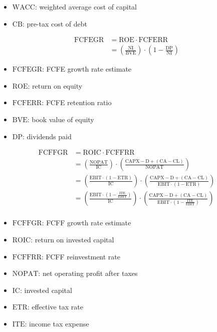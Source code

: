 \begin{itemize}
  \item[] $\text{WACC}$: weighted average cost of capital
  \item[] $\text{CB}$: pre-tax cost of debt
\end{itemize}

$$
\begin{aligned}
\text{FCFEGR} &= \text{ROE} \cdot \text{FCFERR} \\
&= \left( \frac{\text{NI}}{\text{BVE}} \right) \cdot \left( 1 - \frac{\text{DP}}{\text{NI}} \right)
\end{aligned}
$$

\begin{itemize}
  \item[] $\text{FCFEGR}$: FCFE growth rate estimate
  \item[] $\text{ROE}$: return on equity
  \item[] $\text{FCFERR}$: FCFE retention ratio
  \item[] $\text{BVE}$: book value of equity 
  \item[] $\text{DP}$: dividends paid
\end{itemize}

$$
\begin{aligned}
\text{FCFFGR} &= \text{ROIC} \cdot \text{FCFFRR} \\
&= \left( \frac{\text{NOPAT}}{\text{IC}} \right) \cdot \left( \frac{\text{CAPX} - \text{D} + (\text{CA} - \text{CL})}{\text{NOPAT}} \right) \\
&= \left( \frac{\text{EBIT} \cdot (1 - \text{ETR})}{\text{IC}} \right) \cdot \left( \frac{\text{CAPX} - \text{D} + (\text{CA} - \text{CL})}{\text{EBIT} \cdot (1 - \text{ETR})} \right) \\
&= \left( \frac{\text{EBIT} \cdot \left(1 - \frac{\text{ITE}}{\text{EBIT}} \right)}{\text{IC}} \right) \cdot \left( \frac{\text{CAPX} - \text{D} + (\text{CA} - \text{CL})}{\text{EBIT} \cdot \left(1 - \frac{\text{ITE}}{\text{EBIT}} \right) } \right) \\
\end{aligned}
$$

\begin{itemize}
  \item[] $\text{FCFFGR}$: FCFF growth rate estimate
  \item[] $\text{ROIC}$: return on invested capital
  \item[] $\text{FCFFRR}$: FCFF reinvestment rate
  \item[] $\text{NOPAT}$: net operating profit after taxes
  \item[] $\text{IC}$: invested capital
  \item[] $\text{ETR}$: effective tax rate
  \item[] $\text{ITE}$: income tax expense
\end{itemize}

